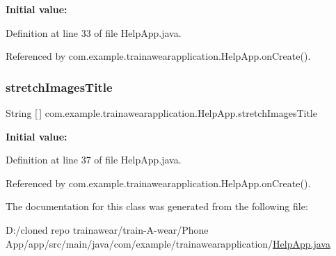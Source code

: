 {\bfseries Initial value\+:}
\begin{DoxyCode}{0}
\DoxyCodeLine{= \textcolor{keyword}{new} \textcolor{keywordtype}{int}[]\{}
\DoxyCodeLine{    \}}

\end{DoxyCode}


Definition at line 33 of file Help\+App.\+java.



Referenced by com.\+example.\+trainawearapplication.\+Help\+App.\+on\+Create().

\mbox{\label{classcom_1_1example_1_1trainawearapplication_1_1_help_app_a3f603b19da94b591732a36617c2eb91d}} 
\subsubsection{\texorpdfstring{stretchImagesTitle}{stretchImagesTitle}}
{\footnotesize\ttfamily String \mbox{[}$\,$\mbox{]} com.\+example.\+trainawearapplication.\+Help\+App.\+stretch\+Images\+Title\hspace{0.3cm}{\ttfamily [private]}}

{\bfseries Initial value\+:}
\begin{DoxyCode}{0}
\DoxyCodeLine{            \textcolor{stringliteral}{"Str1"}, \textcolor{stringliteral}{"Str2"}, \textcolor{stringliteral}{"Str3"}}
\DoxyCodeLine{    \}}

\end{DoxyCode}


Definition at line 37 of file Help\+App.\+java.



Referenced by com.\+example.\+trainawearapplication.\+Help\+App.\+on\+Create().



The documentation for this class was generated from the following file\+:\begin{DoxyCompactItemize}
\item 
D\+:/cloned repo trainawear/train-\/\+A-\/wear/\+Phone App/app/src/main/java/com/example/trainawearapplication/\mbox{\hyperlink{_help_app_8java}{Help\+App.\+java}}\end{DoxyCompactItemize}
